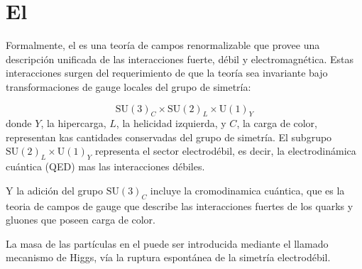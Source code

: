 \section{El \SM}

Formalmente, el {\SM} es una teoría de campos renormalizable que provee una
descripción unificada de las interacciones fuerte, débil y electromagnética.
Estas interacciones surgen del requerimiento de que la teoría sea invariante
bajo transformaciones de gauge locales del grupo de simetría:


\begin{equation}
  \text{SU}(3)_C \times \text{SU}(2)_L \times \text{U}(1)_Y
\end{equation}
%
donde $Y$, la hipercarga, $L$, la helicidad izquierda, y $C$, la carga de color,
representan kas cantidades conservadas del grupo de simetría. El subgrupo
$\text{SU}(2)_L \times \text{U}(1)_Y$ representa el sector electrodébil, es
decir, la electrodinámica cuántica (QED) mas las interacciones débiles.


Y la adición del grupo $\text{SU}(3)_C$ incluye la cromodinamica cuántica, que
es la teoria de campos de gauge que describe las interacciones fuertes de los
quarks y gluones que poseen carga de color.


La masa de las partículas en el {\SM} puede ser introducida mediante el llamado
mecanismo de Higgs\cite{PhysRevLett.13.321, PhysRevLett.13.508}, vía la ruptura
espontánea de la simetría electrodébil.

